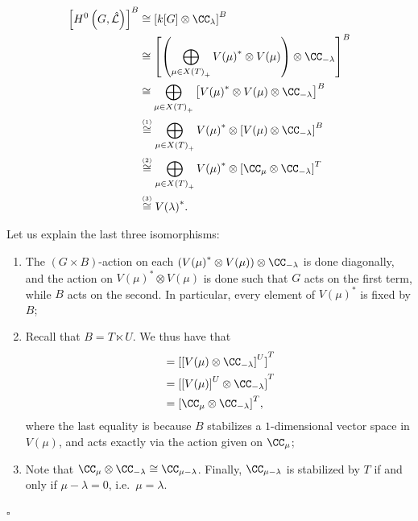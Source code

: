 \begin{align*}
    {\left[H^{0}\left(G, \hat{\mathcal{L}}\right)\right]}^B &\cong {\left[k[G] \otimes \CC_{\lambda}\right]}^B \\
    & \cong {\left[\left(\bigoplus_{\mu \in {X(T)}_+} {V(\mu)}^* \otimes V(\mu)\right) \otimes \CC_{-\lambda}\right]}^B \\
    & \cong \bigoplus_{\mu \in {X(T)}_+} {\left[ {V(\mu)}^*  \otimes V(\mu) \otimes \CC_{-\lambda}\right]}^B \\
    & \overset{\textnormal{\tiny (1)}}{\cong} \bigoplus_{\mu \in {X(T)}_+} {V(\mu)}^* \otimes {\left[V(\mu) \otimes \CC_{-\lambda}\right]}^B \\
    & \overset{\textnormal{\tiny (2)}}{\cong} \bigoplus_{\mu \in {X(T)}_+} {V(\mu)}^* \otimes {\left[\CC_{\mu} \otimes \CC_{-\lambda}\right]}^T \\
    & \overset{\textnormal{\tiny (3)}}{\cong} {V(\lambda)}^*.
\end{align*}

Let us explain the last three isomorphisms:
\begin{enumerate}[label = {(\arabic*)}]
    \item The $(G \times B)$-action on each $({V(\mu)}^* \otimes V(\mu)) \otimes \CC_{- \lambda}$ is done diagonally, and the action on ${V(\mu)}^* \otimes V(\mu)$ is done such that $G$ acts on the first term, while $B$ acts on the second. In particular, every element of ${V(\mu)}^*$ is fixed by $B$;
    \item Recall that $B = T \ltimes U$. We thus have that \begin{align*}
        [V(\mu) \otimes \CC_{-\lambda}] &= {[{[V(\mu) \otimes \CC_{-\lambda}]}^U]}^T \\
            &= {[{[V(\mu)]}^U \otimes \CC_{-\lambda}]}^T \\
            &= {[\CC_{\mu} \otimes \CC_{-\lambda}]}^T,
    \end{align*}
    where the last equality is because $B$ stabilizes a $1$-dimensional vector space in $V(\mu)$, and acts exactly via the action given on $\CC_\mu$;
    \item Note that $\CC_{\mu} \otimes \CC_{-\lambda} \cong \CC_{\mu - \lambda}$. Finally, $\CC_{\mu - \lambda}$ is stabilized by $T$ if and only if $\mu - \lambda = 0$, i.e.~$\mu = \lambda$.
\end{enumerate}

\hfill $\square$